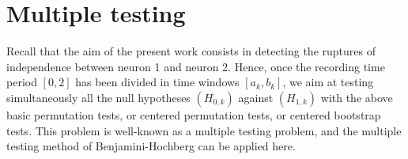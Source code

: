 \documentclass[a4paper,oneside,10pt]{article}
\newcommand{\1}[1]{\ensuremath{\mathds{1}_{\left\{ #1 \right\}}}}  %
\begin{document}
\section{Multiple testing}

Recall that the aim of the present work consists in detecting the ruptures of independence between neuron 1 and neuron 2. Hence, once the recording time period $[0,2]$ has been divided in time windows $[a_k,b_k]$, we aim at testing simultaneously  all the null hypotheses $(H_{0,k})$ against $(H_{1,k})$ with the above basic permutation tests, or centered permutation tests, or centered bootstrap tests. This problem is well-known as a multiple testing problem, and the multiple testing method of Benjamini-Hochberg can be applied here. 
\end{document}
